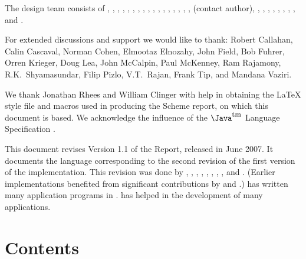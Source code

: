 
The \Xten{} design team consists of
, 
, 
, 
, 
, 
, 
, 
, 
,
,
, 
, 
, 
, 
, 
, 
, 
 (contact author), 
,
,  
, 
, 
,
,
,
, and
.

For extended discussions and support we would like to thank: 
Robert Callahan, Calin
Cascaval, Norman Cohen, Elmootaz Elnozahy, John Field, Bob Fuhrer,
Orren Krieger, Doug Lea, John McCalpin, Paul McKenney, Ram Rajamony,
R.K.~Shyamasundar, Filip Pizlo, V.T.~Rajan, Frank Tip, and Mandana Vaziri.

We thank Jonathan Rhees and William Clinger with help in obtaining the
\LaTeX{} style file and macros used in producing the Scheme report,
on which this document is based. We acknowledge the influence of
the $\mbox{\Java}^{\mbox{\authorsc{\small tm}}}$ Language
Specification \cite{jls2}.

This document revises Version 1.1 of the Report, released in
June 2007. It documents the language corresponding to the second
revision of the first version of the implementation.  This
revision was done by
, 
, 
, 
,
,  
,
,
, and
.
(Earlier implementations benefited from significant contributions by
 and 
.)
 has written many application programs
in \Xten{}.  has helped in the
development of many applications.



\vfill
\eject


\chapter*{Contents}
\addvspace{3.5pt}                  %
\renewcommand{\tocshrink}{-3.5pt}  %
{\footnotesize
\tableofcontents
}

\vfill
\eject


